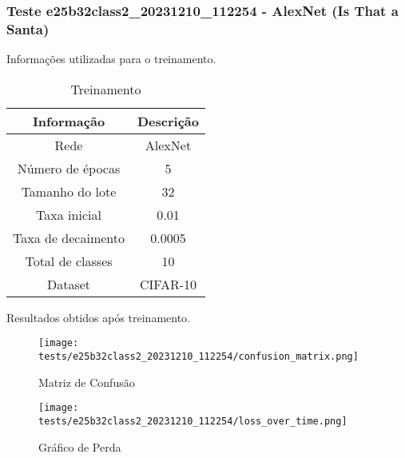 \subsubsection{Teste e25b32class2_20231210_112254 - AlexNet (Is That a Santa)}

Informações utilizadas para o treinamento.

\begin{table}[ht]
   \centering
   \caption{Treinamento}
   \label{tab:modelos}
   \begin{tabular}{| c | c | }
      \hline 
      \textbf{Informação} & \textbf{Descrição} \\
      \hline \hline 
      Rede & AlexNet \\
      \hline
      Número de épocas & 5\\
      \hline
      Tamanho do lote & 32\\
      \hline
      Taxa inicial & 0.01 \\
      \hline
      Taxa de decaimento & 0.0005 \\
      \hline
      Total de classes & 10\\
      \hline
      Dataset & CIFAR-10\\
      \hline
   \end{tabular} 
\end{table}

Resultados obtidos após treinamento.


\begin{figure}[ht]
 \begin{center}
   \texttt{[image: tests/e25b32class2\_20231210\_112254/confusion\_matrix.png]}
  \caption{Matriz de Confusão}
  \label{fig:fig03}
 \end{center}
\end{figure}

\begin{figure}[ht]
 \begin{center}
   \texttt{[image: tests/e25b32class2\_20231210\_112254/loss\_over\_time.png]}
  \caption{Gráfico de Perda}
  \label{fig:fig04}
 \end{center}
\end{figure}
